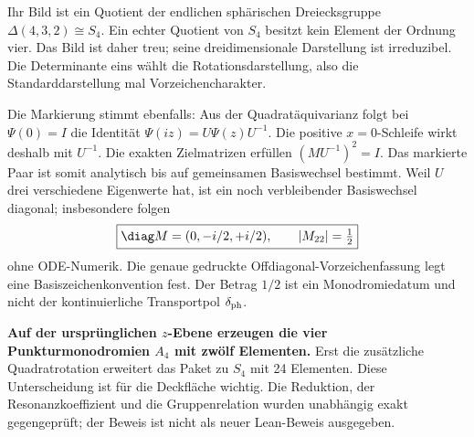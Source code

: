 Ihr Bild ist ein Quotient der endlichen sphärischen Dreiecksgruppe $\Delta(4,3,2)\cong S_4$. Ein echter Quotient von $S_4$ besitzt kein Element der Ordnung vier. Das Bild ist daher treu; seine dreidimensionale Darstellung ist irreduzibel. Die Determinante eins wählt die Rotationsdarstellung, also die Standarddarstellung mal Vorzeichencharakter.

Die Markierung stimmt ebenfalls: Aus der Quadratäquivarianz folgt bei $\Psi(0)=I$ die Identität $\Psi(iz)=U\Psi(z)U^{-1}$. Die positive $x=0$-Schleife wirkt deshalb mit $U^{-1}$. Die exakten Zielmatrizen erfüllen $(MU^{-1})^2=I$. Das markierte Paar ist somit analytisch bis auf gemeinsamen Basiswechsel bestimmt. Weil $U$ drei verschiedene Eigenwerte hat, ist ein noch verbleibender Basiswechsel diagonal; insbesondere folgen
\begin{equation}
\boxed{\diag M=(0,-i/2,+i/2),\qquad |M_{22}|=\tfrac12}
\end{equation}
ohne ODE-Numerik. Die genaue gedruckte Offdiagonal-Vorzeichenfassung legt eine Basiszeichenkonvention fest. Der Betrag $1/2$ ist ein Monodromiedatum und nicht der kontinuierliche Transportpol $\delta_{\rm ph}$.

\textbf{Auf der ursprünglichen $z$-Ebene erzeugen die vier Punkturmonodromien $A_4$ mit zwölf Elementen.} Erst die zusätzliche Quadratrotation erweitert das Paket zu $S_4$ mit 24 Elementen. Diese Unterscheidung ist für die Deckfläche wichtig. Die Reduktion, der Resonanzkoeffizient und die Gruppenrelation wurden unabhängig exakt gegengeprüft; der Beweis ist nicht als neuer Lean-Beweis ausgegeben.

